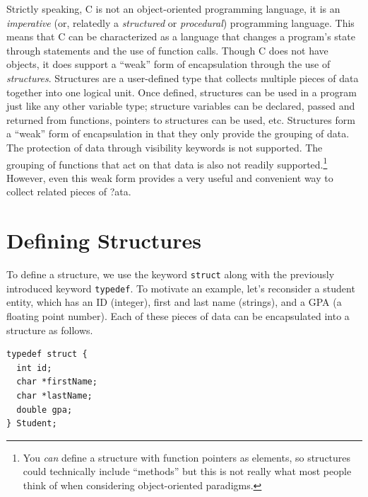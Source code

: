 

Strictly speaking, C is not an object-oriented programming language, 
it is an \emph{imperative} (or, relatedly a \emph{structured} or 
\emph{procedural}) programming language.  This means that C can be 
characterized as a language that changes a program's state through statements
and the use of function calls.  Though C does not have objects, it
does support a ``weak'' form of encapsulation through the use
of \emph{structures}.  Structures are a user-defined type that 
collects multiple pieces of data together into one logical unit.
Once defined, structures can be used in a program just like any
other variable type; structure variables can be declared, passed and returned
from functions, pointers to structures can be used, etc.
Structures form a ``weak'' form of encapsulation in that they only
provide the grouping of data.  The protection of data through 
visibility keywords is not supported.  The grouping of functions
that act on that data is also not readily supported.\footnote{You
\emph{can} define a structure with function pointers as elements, 
so structures could technically include ``methods'' but this is
not really what most people think of when considering object-oriented
paradigms.}  However, even this weak form provides a very useful
and convenient way to collect related pieces of \(  \)?ata.

\section{Defining Structures}

To define a structure, we use the keyword \texttt{struct}
along with the previously introduced keyword \texttt{typedef}.
To motivate an example, let's reconsider a student entity, which
has an ID (integer), first and last name (strings), and a GPA 
(a floating point number).  Each of these pieces of data can be
encapsulated into a structure as follows.

\begin{verbatim}
typedef struct {
  int id;
  char *firstName;
  char *lastName;
  double gpa;
} Student;
\end{verbatim}

